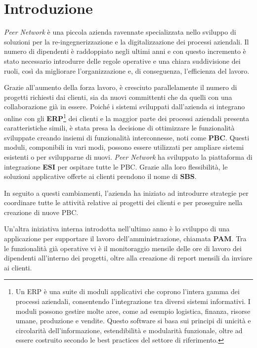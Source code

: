 \chapter{Introduzione}
\label{chap:introduction}
\textit{Peer Network} è una piccola azienda ravennate specializzata nello sviluppo di soluzioni 
per la re-ingegnerizzazione e la digitalizzazione dei processi aziendali. Il numero di dipendenti 
è raddoppiato negli ultimi anni e con questo incremento è stato necessario introdurre delle regole 
operative e una chiara suddivisione dei ruoli, così da migliorare l'organizzazione e, di conseguenza, 
l'efficienza del lavoro.

Grazie all'aumento della forza lavoro, è cresciuto parallelamente il numero di progetti richiesti 
dai clienti, sia da nuovi committenti che da quelli con una collaborazione già in essere. Poiché 
i sistemi sviluppati dall’azienda si integrano online con gli \textbf{\ac{ERP}}\footnote{Un 
\ac{ERP} è una suite di moduli applicativi che coprono l'intera gamma dei processi aziendali, 
consentendo l'integrazione tra diversi sistemi informativi. I moduli possono gestire molte aree, 
come ad esempio logistica, finanza, risorse umane, produzione e vendite. Questo software si basa 
sui principi di unicità e circolarità dell'informazione, estendibilità e modularità funzionale, 
oltre ad essere costruito secondo le best practices del settore di riferimento.}
dei clienti e la maggior parte dei processi aziendali presenta caratteristiche simili, è stata 
presa la decisione di ottimizzare le funzionalità sviluppate creando insiemi di funzionalità 
interconnesse, noti come \textbf{\ac{PBC}}. Questi moduli, componibili in vari modi, possono essere utilizzati 
per ampliare sistemi esistenti o per svilupparne di nuovi. \textit{Peer Network} ha sviluppato la 
piattaforma di integrazione \textbf{\ac{ESI}} per ospitare tutte le \ac{PBC}. Grazie alla loro flessibilità, 
le soluzioni applicative offerte ai clienti prendono il nome di \textbf{\ac{SBS}}.

In seguito a questi cambiamenti, l’azienda ha iniziato ad introdurre strategie per coordinare tutte 
le attività relative ai progetti dei clienti e per proseguire nella creazione di nuove \ac{PBC}.

Un'altra iniziativa interna introdotta nell'ultimo anno è lo sviluppo di una applicazione per supportare 
il lavoro dell'amministrazione, chiamata \textbf{\ac{PAM}}. Tra le funzionalità già operative vi è il monitoraggio 
mensile delle ore di lavoro dei dipendenti all'interno dei progetti, oltre alla creazione di report 
mensili da inviare ai clienti.

